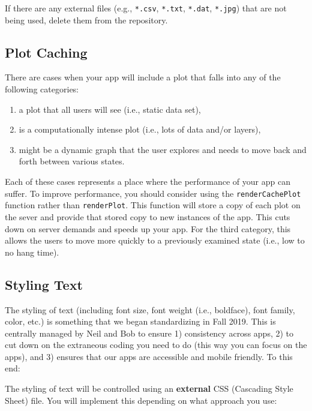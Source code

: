 \documentclass[
]{book}
\providecommand{\tightlist}{%
  \setlength{\itemsep}{0pt}\setlength{\parskip}{0pt}}
\begin{document}
If there are any external files (e.g., \texttt{*.csv}, \texttt{*.txt}, \texttt{*.dat}, \texttt{*.jpg}) that are not being used, delete them from the repository.

\hypertarget{plotCacheb}{%
\subsection{Plot Caching}\label{plotCacheb}}

There are cases when your app will include a plot that falls into any of the following categories:

\begin{enumerate}
\def\labelenumi{\arabic{enumi})}
\tightlist
\item
  a plot that all users will see (i.e., static data set),
\item
  is a computationally intense plot (i.e., lots of data and/or layers),
\item
  might be a dynamic graph that the user explores and needs to move back and forth between various states.
\end{enumerate}

Each of these cases represents a place where the performance of your app can suffer. To improve performance, you should consider using the \texttt{renderCachePlot} function rather than \texttt{renderPlot}. This function will store a copy of each plot on the sever and provide that stored copy to new instances of the app. This cuts down on server demands and speeds up your app. For the third category, this allows the users to move more quickly to a previously examined state (i.e., low to no hang time).

\hypertarget{textStyleb}{%
\subsection{Styling Text}\label{textStyleb}}

The styling of text (including font size, font weight (i.e., boldface), font family, color, etc.) is something that we began standardizing in Fall 2019. This is centrally managed by Neil and Bob to ensure 1) consistency across apps, 2) to cut down on the extraneous coding you need to do (this way you can focus on the apps), and 3) ensures that our apps are accessible and mobile friendly. To this end:

The styling of text will be controlled using an \textbf{external} CSS (Cascading Style Sheet) file. You will implement this depending on what approach you use:
\end{document}
